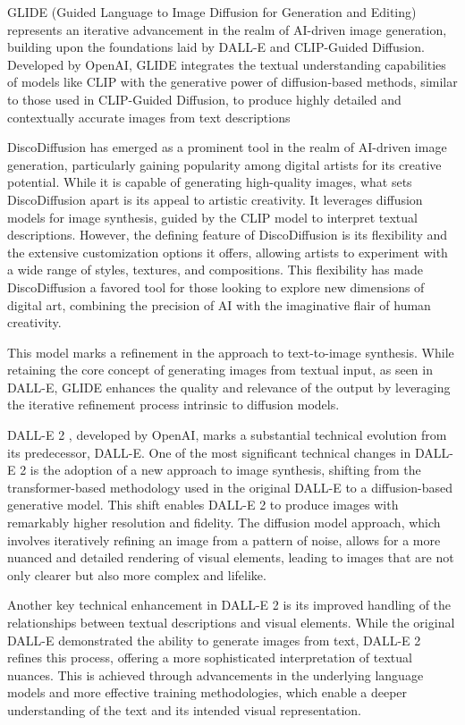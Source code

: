 \documentclass[12pt, letterpaper]{article}
\begin{document}
GLIDE (Guided Language to Image Diffusion for Generation and Editing) \cite{nichol2022glide} represents an iterative advancement in the realm of AI-driven image generation, building upon the foundations laid by DALL-E and CLIP-Guided Diffusion. Developed by OpenAI, GLIDE integrates the textual understanding capabilities of models like CLIP with the generative power of diffusion-based methods, similar to those used in CLIP-Guided Diffusion, to produce highly detailed and contextually accurate images from text descriptions

DiscoDiffusion \cite{alembics2022disco} has emerged as a prominent tool in the realm of AI-driven image generation, particularly gaining popularity among digital artists for its creative potential. While it is capable of generating high-quality images, what sets DiscoDiffusion apart is its appeal to artistic creativity. It leverages diffusion models for image synthesis, guided by the CLIP model to interpret textual descriptions. However, the defining feature of DiscoDiffusion is its flexibility and the extensive customization options it offers, allowing artists to experiment with a wide range of styles, textures, and compositions. This flexibility has made DiscoDiffusion a favored tool for those looking to explore new dimensions of digital art, combining the precision of AI with the imaginative flair of human creativity.

This model marks a refinement in the approach to text-to-image synthesis. While retaining the core concept of generating images from textual input, as seen in DALL-E, GLIDE enhances the quality and relevance of the output by leveraging the iterative refinement process intrinsic to diffusion models.

DALL-E 2 \cite{ramesh2022hierarchical}, developed by OpenAI, marks a substantial technical evolution from its predecessor, DALL-E. One of the most significant technical changes in DALL-E 2 is the adoption of a new approach to image synthesis, shifting from the transformer-based methodology used in the original DALL-E to a diffusion-based generative model. This shift enables DALL-E 2 to produce images with remarkably higher resolution and fidelity. The diffusion model approach, which involves iteratively refining an image from a pattern of noise, allows for a more nuanced and detailed rendering of visual elements, leading to images that are not only clearer but also more complex and lifelike.

Another key technical enhancement in DALL-E 2 is its improved handling of the relationships between textual descriptions and visual elements. While the original DALL-E demonstrated the ability to generate images from text, DALL-E 2 refines this process, offering a more sophisticated interpretation of textual nuances. This is achieved through advancements in the underlying language models and more effective training methodologies, which enable a deeper understanding of the text and its intended visual representation.
\end{document}
